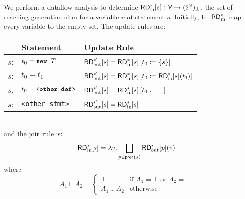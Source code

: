 \documentclass[11pt,notitlepage]{article}
\newcommand{\func}[1]{\ensuremath{\text{\sffamily #1}}}
\begin{document}
We perform a dataflow analysis to determine
$\func{RD}^*_\text{in}[s]:\mathcal{V}\to(2^\mathcal{S})_\bot$, the set
of reaching generation sites for a variable $v$ at statement $s$.
Initially, let $\func{RD}^*_\text{in}$ map every variable to the empty set.
The update rules are:
\\
\begin{tabular}{lll}
&\textbf{Statement}&\textbf{Update Rule}\\\hline
$s$: & $t_0=\text{\tt new }T$ & $\func{RD}^{*'}_\text{out}[s]=\func{RD}^*_\text{in}[s]\left[t_0:=\left\{s\right\}\right]$ \\
$s$: & $t_0=t_1$ & $\func{RD}^{*'}_\text{out}[s]=\func{RD}^*_\text{in}[s]\left[t_0:=\func{RD}^*_\text{in}[s](t_1)\right]$ \\
$s$: & $t_0=\text{\tt<other def>}$ & $\func{RD}^{*'}_\text{out}[s]=\func{RD}^*_\text{in}[s]\left[t_0:=\bot\right]$ \\
$s$: & \texttt{<other stmt>} &  $\func{RD}^{*'}_\text{out}[s]=\func{RD}^*_\text{in}[s]$ \\
\end{tabular}
\\
and the join rule is:
\begin{displaymath}
\func{RD}^*_\text{in}[s] = \lambda v. \bigsqcup_{p\in\func{pred}(s)} \func{RD}^*_\text{out}[p](v)
\end{displaymath}
where
\begin{displaymath}
A_1 \sqcup A_2 = \begin{cases}
\bot & \text{if } A_1=\bot \text{ or } A_2=\bot \\
A_1 \cup A_2 & \text{otherwise}
\end{cases}
\end{displaymath}
\end{document}
